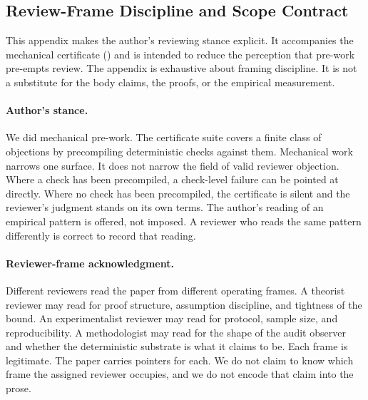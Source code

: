 \subsection{Review-Frame Discipline and Scope Contract}\label{app:review_frame}

This appendix makes the author's reviewing stance explicit. It accompanies the mechanical certificate () and is intended to reduce the perception that pre-work pre-empts review. The appendix is exhaustive about framing discipline. It is not a substitute for the body claims, the proofs, or the empirical measurement.

\paragraph{Author's stance.}
We did mechanical pre-work. The certificate suite covers a finite class of objections by precompiling deterministic checks against them. Mechanical work narrows one surface. It does not narrow the field of valid reviewer objection. Where a check has been precompiled, a check-level failure can be pointed at directly. Where no check has been precompiled, the certificate is silent and the reviewer's judgment stands on its own terms. The author's reading of an empirical pattern is offered, not imposed. A reviewer who reads the same pattern differently is correct to record that reading.

\paragraph{Reviewer-frame acknowledgment.}
Different reviewers read the paper from different operating frames. A theorist reviewer may read for proof structure, assumption discipline, and tightness of the bound. An experimentalist reviewer may read for protocol, sample size, and reproducibility. A methodologist may read for the shape of the audit observer and whether the deterministic substrate is what it claims to be. Each frame is legitimate. The paper carries pointers for each. We do not claim to know which frame the assigned reviewer occupies, and we do not encode that claim into the prose.

